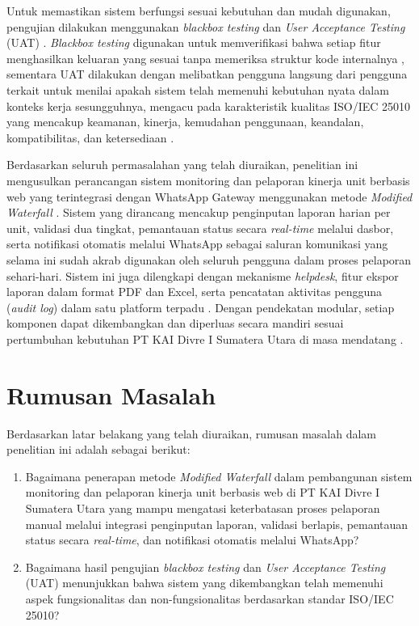 Untuk memastikan sistem berfungsi sesuai kebutuhan dan mudah digunakan, pengujian dilakukan menggunakan \textit{blackbox testing} dan \textit{User Acceptance Testing} (UAT) \cite{abdillah2023blackbox}. \textit{Blackbox testing} digunakan untuk memverifikasi bahwa setiap fitur menghasilkan keluaran yang sesuai tanpa memeriksa struktur kode internalnya \cite{abdillah2023blackbox}, sementara UAT dilakukan dengan melibatkan pengguna langsung dari pengguna terkait untuk menilai apakah sistem telah memenuhi kebutuhan nyata dalam konteks kerja sesungguhnya, mengacu pada karakteristik kualitas ISO/IEC 25010 yang mencakup keamanan, kinerja, kemudahan penggunaan, keandalan, kompatibilitas, dan ketersediaan \cite{lamada2024iso}. \par

Berdasarkan seluruh permasalahan yang telah diuraikan, penelitian ini mengusulkan perancangan sistem monitoring dan pelaporan kinerja unit berbasis web yang terintegrasi dengan WhatsApp Gateway menggunakan metode \textit{Modified Waterfall} \cite{prasnowo2024waterfall}\cite{mallisza2022waterfall}. Sistem yang dirancang mencakup penginputan laporan harian per unit, validasi dua tingkat, pemantauan status secara \textit{real-time} melalui dasbor, serta notifikasi otomatis melalui WhatsApp sebagai saluran komunikasi yang selama ini sudah akrab digunakan oleh seluruh pengguna dalam proses pelaporan sehari-hari. Sistem ini juga dilengkapi dengan mekanisme \textit{helpdesk}, fitur ekspor laporan dalam format PDF dan Excel, serta pencatatan aktivitas pengguna (\textit{audit log}) dalam satu platform terpadu \cite{nugroho2025monitoring}\cite{mallisza2022waterfall}. Dengan pendekatan modular, setiap komponen dapat dikembangkan dan diperluas secara mandiri sesuai pertumbuhan kebutuhan PT KAI Divre I Sumatera Utara di masa mendatang \cite{prasnowo2024waterfall}. \par

\section{Rumusan Masalah} \label{I.Rumusan Masalah}
Berdasarkan latar belakang yang telah diuraikan, rumusan masalah dalam penelitian ini adalah sebagai berikut:
\begin{enumerate}[noitemsep]
    \item Bagaimana penerapan metode \textit{Modified Waterfall} dalam pembangunan sistem monitoring dan pelaporan kinerja unit berbasis web di PT KAI Divre I Sumatera Utara yang mampu mengatasi keterbatasan proses pelaporan manual melalui integrasi penginputan laporan, validasi berlapis, pemantauan status secara \textit{real-time}, dan notifikasi otomatis melalui WhatsApp?
    \item Bagaimana hasil pengujian \textit{blackbox testing} dan \textit{User Acceptance Testing} (UAT) menunjukkan bahwa sistem yang dikembangkan telah memenuhi aspek fungsionalitas dan non-fungsionalitas berdasarkan standar ISO/IEC 25010?
\end{enumerate}

